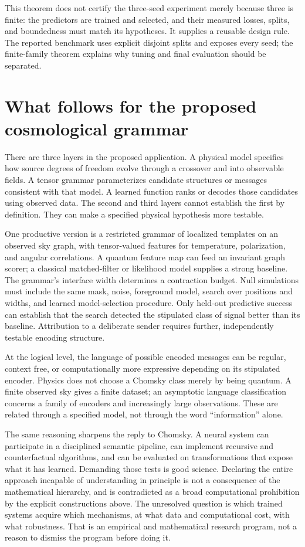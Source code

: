 This theorem does not certify the three-seed experiment merely because three is finite: the predictors are trained and selected, and their measured losses, splits, and boundedness must match its hypotheses. It supplies a reusable design rule. The reported benchmark uses explicit disjoint splits and exposes every seed; the finite-family theorem explains why tuning and final evaluation should be separated.

\section{What follows for the proposed cosmological grammar}

There are three layers in the proposed application. A physical model specifies how source degrees of freedom evolve through a crossover and into observable fields. A tensor grammar parameterizes candidate structures or messages consistent with that model. A learned function ranks or decodes those candidates using observed data. The second and third layers cannot establish the first by definition. They can make a specified physical hypothesis more testable.

One productive version is a restricted grammar of localized templates on an observed sky graph, with tensor-valued features for temperature, polarization, and angular correlations. A quantum feature map can feed an invariant graph scorer; a classical matched-filter or likelihood model supplies a strong baseline. The grammar's interface width determines a contraction budget. Null simulations must include the same mask, noise, foreground model, search over positions and widths, and learned model-selection procedure. Only held-out predictive success can establish that the search detected the stipulated class of signal better than its baseline. Attribution to a deliberate sender requires further, independently testable encoding structure.

At the logical level, the language of possible encoded messages can be regular, context free, or computationally more expressive depending on its stipulated encoder. Physics does not choose a Chomsky class merely by being quantum. A finite observed sky gives a finite dataset; an asymptotic language classification concerns a family of encoders and increasingly large observations. These are related through a specified model, not through the word ``information'' alone.

The same reasoning sharpens the reply to Chomsky. A neural system can participate in a disciplined semantic pipeline, can implement recursive and counterfactual algorithms, and can be evaluated on transformations that expose what it has learned. Demanding those tests is good science. Declaring the entire approach incapable of understanding in principle is not a consequence of the mathematical hierarchy, and is contradicted as a broad computational prohibition by the explicit constructions above. The unresolved question is which trained systems acquire which mechanisms, at what data and computational cost, with what robustness. That is an empirical and mathematical research program, not a reason to dismiss the program before doing it.
